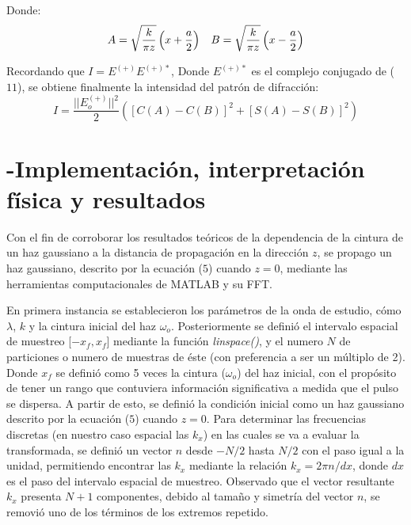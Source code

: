 \documentclass[11pt,letterpaper,twocolumn]{article}
\begin{document}
\par 
Donde: 
\begin{equation}
A=\sqrt{\dfrac{k}{\pi z}}\left( x + \dfrac{a}{2}\right) \hspace*{0.3 cm} B=\sqrt{\dfrac{k}{\pi z}}\left( x - \dfrac{a}{2}\right)
\end{equation}
\par 
Recordando que $I=E^{(+)} E^{(+)*}$, Donde $ E^{(+)*}$ es el complejo conjugado de ($11$), se obtiene finalmente la intensidad del patrón de difracción: 
\begin{equation}
I=\dfrac{||E^{(+)}_{o}||^{2}}{2} \left( \left[C(A)-C(B)\right]^{2} + \left[ S(A)-S(B)\right]^{2} \right)
\end{equation}
\section*{-Implementación, interpretación física y resultados}
Con el fin de corroborar los resultados teóricos de la dependencia de la cintura de un haz gaussiano a la distancia de propagación en la dirección $z$, se propago un haz gaussiano, descrito por la ecuación ($5$) cuando $z=0$, mediante las herramientas computacionales de MATLAB y su FFT.\\
\par 
En primera instancia se establecieron los parámetros de la onda de estudio, cómo $\lambda$, $k$ y la cintura inicial del haz $\omega_{o}$. Posteriormente se definió el intervalo espacial de muestreo [$-x_{f},x_{f}$] mediante la función \textit{linspace()}, y el numero $N$ de particiones o numero de muestras de éste (con preferencia a ser un múltiplo de 2). Donde $x_{f}$ se definió como 5 veces la cintura ($\omega_{o}$) del haz inicial, con el propósito de tener un rango que contuviera información significativa a medida que el pulso se dispersa. A partir de esto, se definió la condición inicial como un haz gaussiano descrito por la ecuación ($5$) cuando $z=0$. Para determinar las frecuencias discretas (en nuestro caso espacial las $k_{x}$) en las cuales se va a evaluar la transformada, se definió un vector $n$ desde $-N/2$ hasta $N/2$ con el paso igual a la unidad, permitiendo encontrar las $k_{x}$ mediante la relación $k_{x}=2 \pi n/dx$, donde $dx$ es el paso del intervalo espacial de muestreo. Observado que el vector resultante $k_{x}$ presenta $N+1$ componentes, debido al tamaño y simetría del vector $n$, se removió uno de los términos de los extremos repetido.\\
\par 
\end{document}
